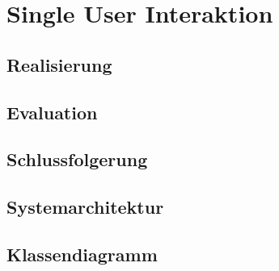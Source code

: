 \chapter{Single User Interaktion}
\label{ch:Single_User_Interaktion}

\section{Realisierung}

\section{Evaluation}

\section{Schlussfolgerung}

\section{Systemarchitektur}

\section{Klassendiagramm}